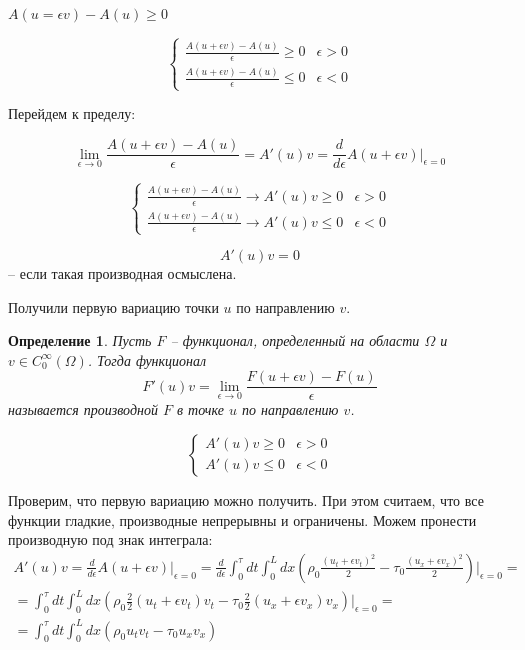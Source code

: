 \documentclass[12pt]{report}
\newtheorem{definition}{Определение}
\begin{document}
$A(u = \epsilon v) - A(u) \ge 0$

$$
    \begin{cases}
        \frac{A(u + \epsilon v) - A(u)}{\epsilon} \ge 0 & \epsilon > 0
        \\
        \frac{A(u + \epsilon v) - A(u)}{\epsilon} \le 0 & \epsilon < 0
    \end{cases}
$$

Перейдем к пределу:

$$
    \lim_{\epsilon \longrightarrow 0}{\frac{A(u + \epsilon v) - A(u)}{\epsilon}} = A'(u)v = \frac{d}{d \epsilon}A(u + \epsilon v) \vert_{\epsilon = 0}
$$

$$
    \begin{cases}
        \frac{A(u + \epsilon v) - A(u)}{\epsilon} \longrightarrow A'(u)v \ge 0 & \epsilon > 0
        \\
        \frac{A(u + \epsilon v) - A(u)}{\epsilon} \longrightarrow A'(u)v \le 0 & \epsilon < 0
    \end{cases}
$$

$$
    A'(u)v = 0
$$
-- если такая производная осмыслена. 

Получили первую вариацию точки $u$ по направлению $v$. 

\begin{definition}
    Пусть $F$ -- функционал, определенный на области $\Omega$ и $v \in C_0^\infty(\Omega)$. Тогда функционал 
    $$
        F'(u)v = \lim_{\epsilon \longrightarrow 0}{\frac{F(u + \epsilon v) - F(u)}{\epsilon}}
    $$
    называется производной $F$ в точке $u$ по направлению $v$.
\end{definition}

$$
    \begin{cases}
        A'(u)v \ge 0 & \epsilon > 0
        \\
        A'(u)v \le 0 & \epsilon < 0
    \end{cases}
$$

Проверим, что первую вариацию можно получить. При этом считаем, что все функции гладкие, производные непрерывны и ограничены. Можем пронести производную под знак интеграла: 
$$
    \begin{gathered}
        A'(u)v = \frac{d}{d \epsilon}A(u + \epsilon v) \vert_{\epsilon = 0} = \frac{d}{d \epsilon}\int^{\tau}_{0}{dt \int^{L}_{0}{dx(\rho_0 \frac{(u_t + \epsilon v_t) ^ 2}{2} - \tau_0 \frac{(u_x+ \epsilon v_x) ^ 2}{2}) \vert_{\epsilon = 0}}} =
        \\
        = \int^{\tau}_{0}{dt \int^{L}_{0}{dx (\rho_0 \frac{2}{2}(u_t + \epsilon v_t)v_t - \tau_0 \frac{2}{2}(u_x + \epsilon v_x)v_x) \vert_{\epsilon = 0}}} = 
        \\
        = \int^{\tau}_{0}{dt \int^{L}_{0}{dx (\rho_0 u_t v_t - \tau_0 u_x v_x)}}
    \end{gathered}
$$
\end{document}
